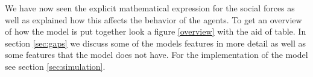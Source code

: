 We have now seen the explicit mathematical expression for the social forces 
as well as explained how this affects the behavior of the agents. To get an 
overview of how the model is put together look a figure \ref{overview} with 
the aid of table. In section \ref{sec:gaps} 
we discuss some of the models features in more detail as well as some features 
that the model does not have. For the implementation of the model see section \ref{sec:simulation}.